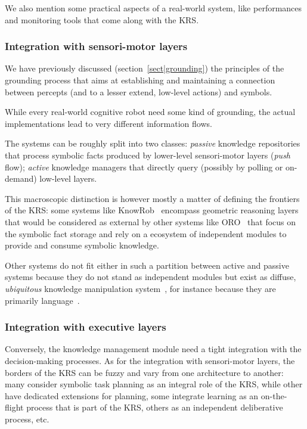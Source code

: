 We also mention some practical aspects of a real-world system, like
performances and monitoring tools that come along with the KRS.

\subsubsection{Integration with sensori-motor layers}
\label{sect|integration-sensorimotor}

We have previously discussed (section~\ref{sect|grounding}) the principles of
the grounding process that aims at establishing and maintaining a connection
between percepts (and to a lesser extend, low-level actions) and symbols.

While every real-world cognitive robot need some kind of grounding, the actual
implementations lead to very different information flows.

The systems can be roughly split into two classes: \emph{passive} knowledge
repositories that process symbolic facts produced by lower-level sensori-motor
layers (\emph{push} flow); \emph{active} knowledge managers that directly query
(possibly by polling or on-demand) low-level layers.

This macroscopic distinction is however mostly a matter of defining the
frontiers of the KRS: some systems like KnowRob~\cite{Tenorth2009a} encompass
geometric reasoning layers that would be considered as external by other
systems like ORO~\cite{Lemaignan2010} that focus on the symbolic fact storage
and rely on a ecosystem of independent modules to provide and consume symbolic
knowledge.


Other systems do not fit either in such a partition between active and passive
systems because they do not stand as independent modules but exist as diffuse,
\emph{ubiquitous} knowledge manipulation system~\cite{Jacobsson2008}, for
instance because they are primarily language~\cite{Ferrein2008, Sabri2011}.

\subsubsection{Integration with executive layers}
\label{sect|integration-executive-layers}

Conversely, the knowledge management module need a tight integration with the
decision-making processes. As for the integration with sensori-motor
layers, the borders of the KRS can be fuzzy and vary from one architecture to
another: many consider symbolic task planning as an integral role of the KRS,
while other have dedicated extensions for planning, some integrate learning as
an on-the-flight process that is part of the KRS, others as an independent
deliberative process, etc.

